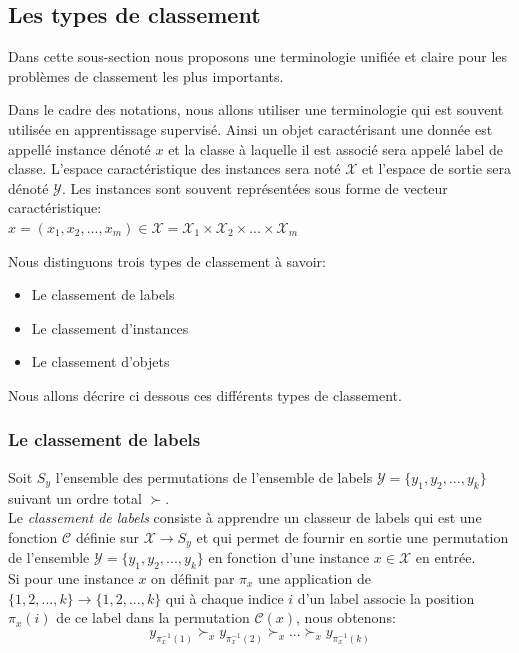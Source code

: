 \documentclass[a4paper,12pt,openany,oneside]{article}
\begin{document}
\subsection{Les types de classement}


Dans cette sous-section nous proposons une terminologie unifiée et claire pour les problèmes de classement les plus importants.

Dans le cadre des notations, nous allons utiliser une terminologie qui est souvent utilisée en apprentissage supervisé. Ainsi un objet caractérisant une donnée est appellé instance dénoté $x$ et la classe à laquelle il est associé sera appelé label de classe. L'espace caractéristique des instances sera noté $\mathcal{X}$ et l'espace de sortie sera dénoté $\mathcal{Y}$.
Les instances sont souvent représentées sous forme de vecteur caractéristique:\\
$x=(x_1,x_2,...,x_m)\in \mathcal{X}=\mathcal{X}_1\times \mathcal{X}_2\times ... \times \mathcal{X}_m$

Nous distinguons trois types de classement à savoir:
\begin{itemize}
	\item Le classement de labels
	\item Le classement d'instances
	\item Le classement d'objets
\end{itemize}
Nous allons décrire ci dessous ces différents types de classement.

\subsubsection{Le classement de labels}
Soit $S_y$ l'ensemble des permutations de l'ensemble de labels $\mathcal{Y}=\{y_1,y_2,...,y_k\}$ suivant un ordre total $\succ$.\\
Le \textit{classement de labels} consiste à apprendre un classeur de labels qui est une fonction $\mathcal{C}$ définie sur $\mathcal{X}\rightarrow S_y$ et qui permet de fournir en sortie une permutation de l'ensemble $\mathcal{Y}=\{y_1,y_2,...,y_k\}$ en fonction d'une instance $x\in \mathcal{X}$ en entrée.\\
Si pour une instance $x$ on définit par $\pi_x$ une application de $\{1,2,...,k\}\rightarrow\{1,2,...,k\}$ qui à chaque indice $i$ d'un label  associe la position $\pi_x(i)$ de ce label dans la permutation $\mathcal{C}(x)$, nous obtenons:
\[
	y_{\pi_x^{-1} (1)}\succ_x y_{\pi_x^{-1} (2)}\succ_x ...\succ_x y_{\pi_x^{-1} (k)}
\]
\end{document}
